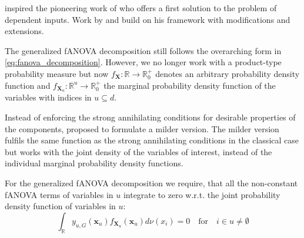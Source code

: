 \cite{stone1994} inspired the pioneering work of \cite{hooker2007} who offers a first solution to the problem of dependent inputs. Work by \cite{chastaing2012} and \cite{rahman2014} build on his framework with modifications and extensions.\par
The generalized fANOVA decomposition still follows the overarching form in \autoref{eq:fanova_decomposition}.
However, we no longer work with a product-type probability measure but now $f_{\boldsymbol{X}}: \mathbb{R} \rightarrow \mathbb{R}_{0}^{+}$ denotes an arbitrary probability density function and $f_{\boldsymbol{X}_u}: \mathbb{R}^u \rightarrow \mathbb{R}_{0}^{+}$ the marginal probability density function of the variables with indices in $u \subseteq d$.\par

Instead of enforcing the strong annihilating conditions for desirable properties of the components, \cite{rahman2014} proposed to formulate a milder version.
The milder version fulfils the same function as the strong annihilating conditions in the classical case but works with the joint density of the variables of interest, instead of the individual marginal probability density functions.
\begin{condition}
    For the generalized fANOVA decomposition we require, that all the non-constant fANOVA terms of variables in $u$ integrate to zero w.r.t. the joint probability density function of variables in $u$:
\begin{equation}
    \int_{\mathbb{R}} y_{u, G}(\boldsymbol{x}_u) f_{\boldsymbol{X}_u}(\boldsymbol{x}_u) d\nu (x_i) = 0 \quad \text{for} \quad i \in u \neq \emptyset
\end{equation}
\end{condition}


